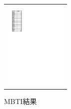 \documentclass[uplatex]{jsarticle}
\begin{document}
\begin{figure}[h]
   \begin{tabular}{c}

      \begin{minipage}{0.33\hsize}
        \begin{center}
   \includegraphics[width=3cm,clip]{wariai.pdf}
  \caption{MBTI結果}
  \label{wariai}
  \end{center}
 \end{minipage}


\end{tabular}
\end{figure}
\end{document}
